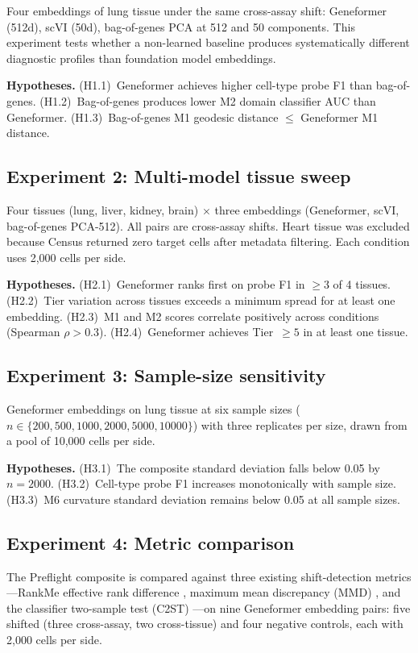 \documentclass[11pt,letterpaper]{article}
\begin{document}
Four embeddings of lung tissue under the same cross-assay shift: Geneformer (512d), scVI (50d), bag-of-genes PCA at 512 and 50 components. This experiment tests whether a non-learned baseline produces systematically different diagnostic profiles than foundation model embeddings.

\textbf{Hypotheses.} (H1.1)~Geneformer achieves higher cell-type probe F1 than bag-of-genes. (H1.2)~Bag-of-genes produces lower M2 domain classifier AUC than Geneformer. (H1.3)~Bag-of-genes M1 geodesic distance $\leq$ Geneformer M1 distance.

\subsection{Experiment 2: Multi-model tissue sweep}

Four tissues (lung, liver, kidney, brain) $\times$ three embeddings (Geneformer, scVI, bag-of-genes PCA-512). All pairs are cross-assay shifts. Heart tissue was excluded because Census returned zero target cells after metadata filtering. Each condition uses 2,000 cells per side.

\textbf{Hypotheses.} (H2.1)~Geneformer ranks first on probe F1 in $\geq 3$ of 4 tissues. (H2.2)~Tier variation across tissues exceeds a minimum spread for at least one embedding. (H2.3)~M1 and M2 scores correlate positively across conditions (Spearman $\rho > 0.3$). (H2.4)~Geneformer achieves Tier~$\geq 5$ in at least one tissue.

\subsection{Experiment 3: Sample-size sensitivity}

Geneformer embeddings on lung tissue at six sample sizes ($n \in \{200, 500, 1000, 2000, 5000, 10000\}$) with three replicates per size, drawn from a pool of 10,000 cells per side.

\textbf{Hypotheses.} (H3.1)~The composite standard deviation falls below 0.05 by $n = 2000$. (H3.2)~Cell-type probe F1 increases monotonically with sample size. (H3.3)~M6 curvature standard deviation remains below 0.05 at all sample sizes.

\subsection{Experiment 4: Metric comparison}

The Preflight composite is compared against three existing shift-detection metrics---RankMe effective rank difference \citep{garrido2023rankme}, maximum mean discrepancy (MMD) \citep{gretton2012mmd}, and the classifier two-sample test (C2ST) \citep{lopezpaz2017c2st}---on nine Geneformer embedding pairs: five shifted (three cross-assay, two cross-tissue) and four negative controls, each with 2,000 cells per side.
\end{document}
